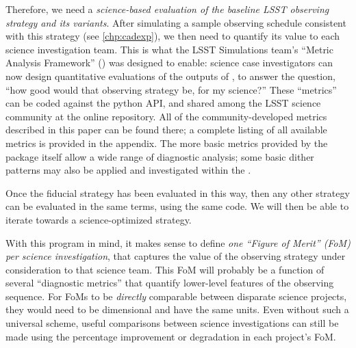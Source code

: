 Therefore, we need a {\it science-based evaluation of the baseline LSST
observing strategy and its variants}. After simulating a sample
observing schedule consistent with this strategy (see
\autoref{chp:cadexp}), we then need to quantify its value to each
science investigation team.  This is what the LSST Simulations team's ``Metric
Analysis Framework'' (\MAF) was designed to enable: science case investigators
can now design quantitative evaluations of the outputs of \OpSim, to
answer the question, ``how good would that observing strategy be, for my
science?'' These ``metrics'' can be coded against the \MAF python API, and
shared among the LSST science community at the
\href{https://sims-maf.lsst.io/metricList.html#contributed-mafcontrib-metrics}{\simsMafContrib}
online repository.
All of the community-developed \MAF metrics described in this paper can be found there; a complete listing of all available \MAF metrics is provided in the appendix. The more basic metrics provided by the \MAF package itself allow a wide range of diagnostic analysis; some basic dither patterns may also be applied and investigated within the \MAF.

Once the fiducial strategy has
been evaluated in this way, then any other strategy can be evaluated
in the same terms, using the same code.  We will then be able to iterate towards a
science-optimized strategy.

With this program in mind, it makes sense to define {\it one ``Figure
of Merit'' (FoM) per science investigation}, that captures the value of  the
observing strategy under consideration to that science team. This FoM
will probably be a function of several ``diagnostic metrics'' that quantify
lower-level features of the observing sequence.  For FoMs
to be {\it directly} comparable between disparate science projects,  they would
need to be dimensional and have the same units. Even without such a universal scheme, useful comparisons between science investigations can still be made using the percentage improvement or degradation in each project's FoM.

